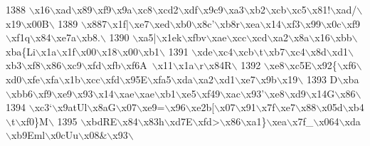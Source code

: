 \begin{DoxyCode}
1388 \textcolor{stringliteral}{\(\backslash\)x16\(\backslash\)xad\(\backslash\)x89\(\backslash\)xf9\(\backslash\)x9a\(\backslash\)xc8\(\backslash\)xcd2\(\backslash\)xdf\(\backslash\)x9c9\(\backslash\)xa3\(\backslash\)xb2\(\backslash\)xcb\(\backslash\)xc5\(\backslash\)x81!\(\backslash\)xad/\(\backslash\)x19\(\backslash\)x00B\(\backslash\)}
1389 \textcolor{stringliteral}{\(\backslash\)x887\(\backslash\)x1f|\(\backslash\)xe7\(\backslash\)xed\(\backslash\)xb0\(\backslash\)x8c'\(\backslash\)xb8r\(\backslash\)xea\(\backslash\)x14\(\backslash\)xf3\(\backslash\)x99\(\backslash\)x0c\(\backslash\)xf9\(\backslash\)xf1q\(\backslash\)x84\(\backslash\)xe7a\(\backslash\)xb8.\(\backslash\)}
1390 \textcolor{stringliteral}{\(\backslash\)xa5|\(\backslash\)x1ek\(\backslash\)xfbv\(\backslash\)xae\(\backslash\)xcc\(\backslash\)xcd\(\backslash\)xa2\(\backslash\)x8a\(\backslash\)x16\(\backslash\)xbb\(\backslash\)xba\{Li\(\backslash\)x1a\(\backslash\)x1f\(\backslash\)x00\(\backslash\)x18\(\backslash\)x00\(\backslash\)xb1\(\backslash\)}
1391 \textcolor{stringliteral}{\(\backslash\)xde\(\backslash\)xc4\(\backslash\)xcb\(\backslash\)t\(\backslash\)xb7\(\backslash\)xc4\(\backslash\)x8d\(\backslash\)xd1\(\backslash\)xb3\(\backslash\)xf8\(\backslash\)x86\(\backslash\)xc9\(\backslash\)xfd\(\backslash\)xfb\(\backslash\)xf6A~\(\backslash\)x11\(\backslash\)x1a\(\backslash\)r\(\backslash\)x84R\(\backslash\)}
1392 \textcolor{stringliteral}{\(\backslash\)xe8\(\backslash\)xc5E\(\backslash\)x92\{\(\backslash\)xf6\(\backslash\)xd0\(\backslash\)xfe\(\backslash\)xfa\(\backslash\)x1b\(\backslash\)xcc\(\backslash\)xfd\(\backslash\)x95E\(\backslash\)xfa5\(\backslash\)xda\(\backslash\)xa2\(\backslash\)xd1\(\backslash\)xe7\(\backslash\)x9b\(\backslash\)x19\(\backslash\)}
1393 \textcolor{stringliteral}{D\(\backslash\)xba\(\backslash\)xbb6\(\backslash\)xf9\(\backslash\)xe9\(\backslash\)x93\(\backslash\)x14\(\backslash\)xae\(\backslash\)xae\(\backslash\)xb1\(\backslash\)xe5\(\backslash\)xf49\(\backslash\)xac\(\backslash\)x93'\(\backslash\)xe8\(\backslash\)xd9\(\backslash\)x14G\(\backslash\)x86\(\backslash\)}
1394 \textcolor{stringliteral}{\(\backslash\)xc3`\(\backslash\)x9atUl\(\backslash\)x8aG\(\backslash\)x07\(\backslash\)xe9=\(\backslash\)x96\(\backslash\)xe2b[\(\backslash\)x07\(\backslash\)x91\(\backslash\)x7f\(\backslash\)xe7\(\backslash\)x88\(\backslash\)x05d\(\backslash\)xb4\(\backslash\)t\(\backslash\)xf0\}M\(\backslash\)}
1395 \textcolor{stringliteral}{\(\backslash\)xbdRE\(\backslash\)x84\(\backslash\)x83h\(\backslash\)xd7E\(\backslash\)xfd>\(\backslash\)x86\(\backslash\)xa1\}\(\backslash\)xea\(\backslash\)x7f\_\(\backslash\)x064\(\backslash\)xda\(\backslash\)xb9Eml\(\backslash\)x0cUu\(\backslash\)x08&\(\backslash\)x93\(\backslash\)}

\end{DoxyCode}
